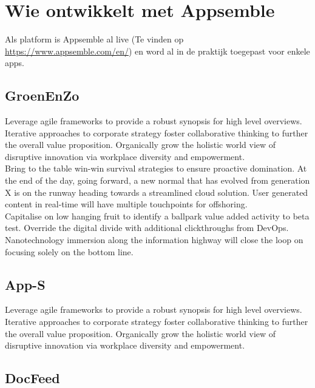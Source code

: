 \chapter{Wie ontwikkelt met Appsemble}


Als platform is Appsemble al live (Te vinden op \href{https://www.appsemble.com/en/}{https://www.appsemble.com/en/}) en word al in de praktijk toegepast voor enkele apps.

\section{GroenEnZo}

Leverage agile frameworks to provide a robust synopsis for high level overviews. Iterative approaches to corporate strategy foster collaborative thinking to further the overall value proposition. Organically grow the holistic world view of disruptive innovation via workplace diversity and empowerment.\\

Bring to the table win-win survival strategies to ensure proactive domination. At the end of the day, going forward, a new normal that has evolved from generation X is on the runway heading towards a streamlined cloud solution. User generated content in real-time will have multiple touchpoints for offshoring. \\

Capitalise on low hanging fruit to identify a ballpark value added activity to beta test. Override the digital divide with additional clickthroughs from DevOps. Nanotechnology immersion along the information highway will close the loop on focusing solely on the bottom line. 

\section{App-S}

Leverage agile frameworks to provide a robust synopsis for high level overviews. Iterative approaches to corporate strategy foster collaborative thinking to further the overall value proposition. Organically grow the holistic world view of disruptive innovation via workplace diversity and empowerment.\\

\section{DocFeed}

